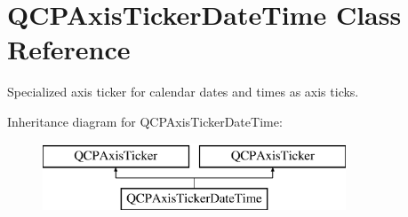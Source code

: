 \hypertarget{class_q_c_p_axis_ticker_date_time}{}\section{Q\+C\+P\+Axis\+Ticker\+Date\+Time Class Reference}
\label{class_q_c_p_axis_ticker_date_time}


Specialized axis ticker for calendar dates and times as axis ticks.  


Inheritance diagram for Q\+C\+P\+Axis\+Ticker\+Date\+Time\+:\begin{figure}[H]
\begin{center}
\leavevmode
\includegraphics[height=2.000000cm]{class_q_c_p_axis_ticker_date_time}
\end{center}
\end{figure}
